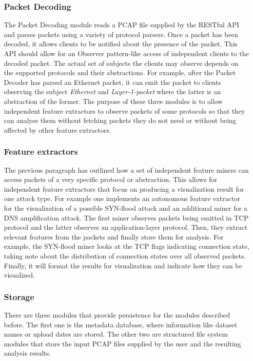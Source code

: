 \subsubsection{Packet Decoding}
The Packet Decoding module reads a PCAP file supplied by the RESTful API and parses packets using a variety of protocol parsers. Once a packet has been decoded, it allows clients to be notified about the presence of the packet. This API should allow for an Observer pattern-like access of independent clients to the decoded packet. The actual set of subjects the clients may observe depends on the supported protocols and their abstractions. For example, after the Packet Decoder has parsed an Ethernet packet, it can emit the packet to clients observing the subject \textit{Ethernet} and \textit{Layer-1-packet} where the latter is an abstraction of the former. The purpose of these three modules is to allow independent feature extractors to observe packets of some protocols so that they can analyse them without fetching packets they do not need or without being affected by other feature extractors.

\subsubsection{Feature extractors}
The previous paragraph has outlined how a set of independent feature miners can access packets of a very specific protocol or abstraction. This allows for independent feature extractors that focus on producing a visualization result for one attack type. For example one implements an autonomous feature extractor for the visualization of a possible SYN-flood attack and an additional miner for a DNS amplification attack. The first miner observes packets being emitted in TCP protocol and the latter observes an application-layer protocol. Then, they extract relevant features from the packets and finally store them for analysis. For example, the SYN-flood miner looks at the TCP flags indicating connection state, taking note about the distribution of connection states over all observed packets. Finally, it will format the results for visualization and indicate how they can be visualized.

\subsubsection{Storage}
There are three modules that provide persistence for the modules described before. The first one is the metadata database, where information like dataset names or upload dates are stored. The other two are structured file system modules that store the input PCAP files supplied by the user and the resulting analysis results.

